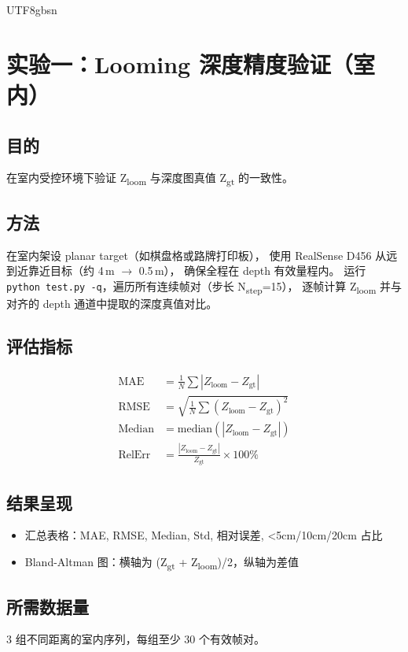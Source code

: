 \documentclass{article}
\begin{document}
\begin{CJK}{UTF8}{gbsn}
\clearpage

\section{实验一：Looming 深度精度验证（室内）}

\subsection{目的}
在室内受控环境下验证 Z\textsubscript{loom} 与深度图真值 Z\textsubscript{gt} 的一致性。

\subsection{方法}
在室内架设 planar target（如棋盘格或路牌打印板），
使用 RealSense D456 从远到近靠近目标（约 4\,m $\rightarrow$ 0.5\,m），
确保全程在 depth 有效量程内。
运行 \texttt{python test.py -q}，遍历所有连续帧对（步长 N\textsubscript{step}=15），
逐帧计算 Z\textsubscript{loom} 并与对齐的 depth 通道中提取的深度真值对比。

\subsection{评估指标}

\begin{align*}
\text{MAE} &= \frac{1}{N}\sum |Z_{\text{loom}} - Z_{\text{gt}}| \\
\text{RMSE} &= \sqrt{\frac{1}{N}\sum (Z_{\text{loom}} - Z_{\text{gt}})^2} \\
\text{Median} &= \text{median}(|Z_{\text{loom}} - Z_{\text{gt}}|) \\
\text{RelErr} &= \frac{|Z_{\text{loom}} - Z_{\text{gt}}|}{Z_{\text{gt}}} \times 100\%
\end{align*}

\subsection{结果呈现}

\begin{itemize}
    \item 汇总表格：MAE, RMSE, Median, Std, 相对误差, <5cm/10cm/20cm 占比
    \item Bland-Altman 图：横轴为 (Z\textsubscript{gt} + Z\textsubscript{loom})/2，纵轴为差值
\end{itemize}

\subsection{所需数据量}
3 组不同距离的室内序列，每组至少 30 个有效帧对。


\end{CJK}
\end{document}
